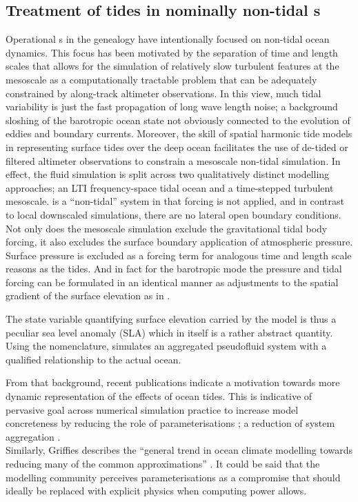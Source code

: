 \subsection{Treatment of tides in nominally non-tidal \OGCM{}s}
\label{sec:tides_ogcm}
Operational \OGCM{}s in the \GODAE{} genealogy have intentionally focused on non-tidal ocean dynamics. This focus has been motivated by the separation of time and length scales that allows for the simulation of relatively slow turbulent features at the mesoscale as a computationally tractable problem that can be adequately constrained by along-track altimeter observations.
In this view, much tidal variability is just the fast propagation of long wave length noise; a background sloshing of the barotropic ocean state not obviously connected to the evolution of eddies and boundary currents.
Moreover, the skill of spatial harmonic tide models in representing surface tides over the deep ocean facilitates the use of de-tided or filtered altimeter observations to constrain a mesoscale non-tidal simulation. In effect, the fluid simulation is split across two qualitatively distinct modelling approaches; an LTI frequency-space tidal ocean and a time-stepped turbulent mesoscale.  
\BL{} is a ``non-tidal'' system in that \ATGP{} forcing is not applied, and in contrast to local downscaled simulations, there are no lateral open boundary conditions. Not only does the mesoscale simulation exclude the gravitational tidal body forcing, it also excludes the surface boundary application of atmospheric pressure.   
Surface pressure is excluded as a forcing term for analogous time and length scale reasons as the tides.  And in fact for the barotropic mode the pressure and tidal forcing can be formulated in an identical manner as adjustments to the spatial gradient of the surface elevation as in \citet[Eq9.9.5]{gill1982atmosphere}.

The state variable quantifying surface elevation carried by the model is thus a peculiar sea level anomaly (SLA) which in itself is a rather abstract quantity. 
Using the \citet{Stevens:2001kb} nomenclature, \BL{} simulates an aggregated pseudofluid system with a qualified relationship to the actual ocean.


From that background, recent publications indicate a motivation towards more dynamic representation of the effects of ocean tides.   This is indicative of pervasive goal across numerical simulation practice to increase model concreteness by reducing the role of parameterisations \citep[section 5.3]{Petersen:2012tr}; a reduction of system aggregation \citep{Stevens:2001kb}.\\
Similarly, Griffies describes the ``general trend in ocean climate modelling towards reducing many of the common approximations'' \citep[pp20] {Griffies:2004vs}.   It could be said that the modelling community perceives parameterisations as a compromise that should ideally be replaced with explicit physics when computing power allows.

